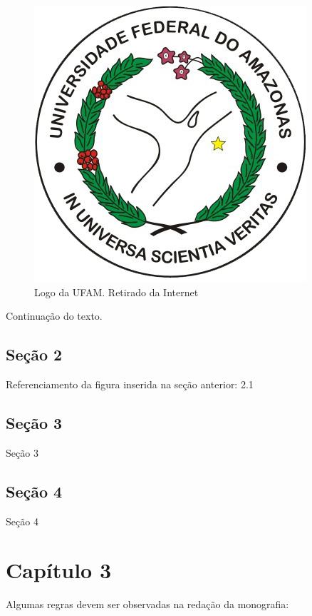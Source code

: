 \documentclass[
	12pt,			%
	openright,		%
	oneside,	
	a4paper,		%
	english,		%
	brazil			%
]{abntex2/abntex2}  %
\begin{document}
		\begin{figure}[h!]
			\begin{center}
			    \includegraphics[scale=0.5]{abntex2/ufam-logo}
			\end{center}
			\caption{\label{fig_grafico}Logo da UFAM. Retirado da Internet}
		\end{figure}
		
		Continuação do texto.
		
	\section{Seção 2}
	
		Referenciamento da figura inserida na seção anterior: 2.1
		
	\section{Seção 3}
	
		Seção 3
		
	\section{Seção 4}
	
		Seção 4

\chapter{Capítulo 3}

	Algumas regras devem ser observadas na redação da monografia:
\end{document}

